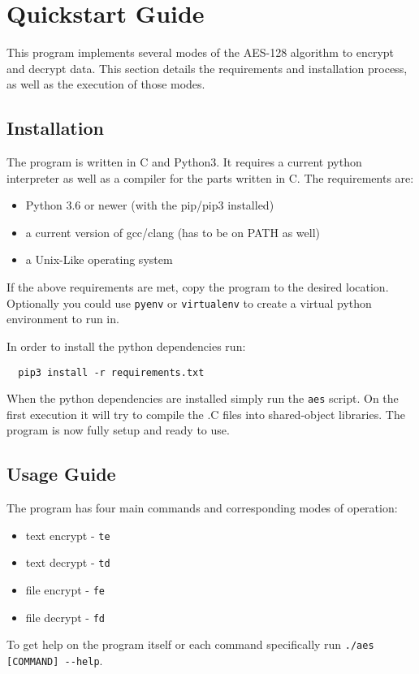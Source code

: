 \section{Quickstart Guide}

This program implements several modes of the AES-128 algorithm to encrypt and decrypt data. This section details the requirements and installation process, as well as the execution of those modes.

\subsection{Installation}

The program is written in C and Python3. It requires a current python interpreter as well as a compiler for the parts written in C. The requirements are:
\begin{itemize}
  \item Python 3.6 or newer (with the pip/pip3 installed)
  \item a current version of gcc/clang (has to be on PATH as well)
  \item a Unix-Like operating system
\end{itemize}

If the above requirements are met, copy the program to the desired location. Optionally you could use \lstinline{pyenv} or \lstinline{virtualenv} to create a virtual python environment to run in.

In order to install the python dependencies run:
\begin{lstlisting}
  pip3 install -r requirements.txt
\end{lstlisting}

When the python dependencies are installed simply run the \lstinline{aes} script. On the first execution it will try to compile the .C files into shared-object libraries. The program is now fully setup and ready to use.

\subsection{Usage Guide}
The program has four main commands and corresponding modes of operation:
\begin{itemize}
  \item text encrypt -  \lstinline{te}
  \item text decrypt -  \lstinline{td}
  \item file encrypt -  \lstinline{fe}
  \item file decrypt -  \lstinline{fd}
\end{itemize}
To get help on the program itself or each command specifically run \lstinline{./aes [COMMAND] --help}.


